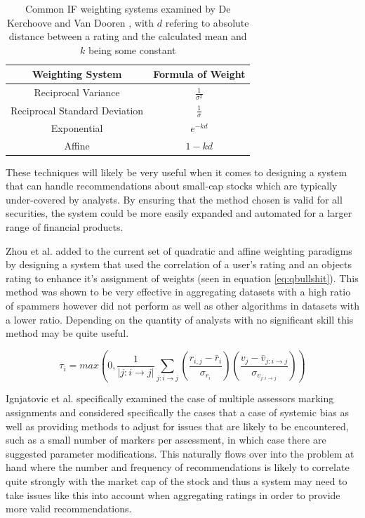 \begin{table}[H]
    \centering
    \begin{tabular}{c c}
    \toprule\toprule
    Weighting System & Formula of Weight \\ \midrule
    Reciprocal Variance & $\frac{1}{\sigma^2}$ \\
    \addlinespace
    Reciprocal Standard Deviation & $\frac{1}{\sigma}$\\
    \addlinespace
    Exponential & $e^{-kd}$ \\
    \addlinespace
    Affine & $1-kd$ \\ \bottomrule
    \end{tabular}
    \caption[Common IF weighting systems]{Common IF weighting systems examined by De Kerchoove and Van Dooren \cite{de2010iterative}, with $d$ refering to absolute distance between a rating and the calculated mean and $k$ being some constant}
    \label{tab:deKerchWeight}
\end{table}

These techniques will likely be very useful when it comes to designing a system that can handle recommendations about small-cap stocks which are typically under-covered by analysts. By ensuring that the method chosen is valid for all securities, the system could be more easily expanded and automated for a larger range of financial products.

Zhou et al. \cite{zhou2011robust} added to the current set of quadratic and affine weighting paradigms by designing a system that used the correlation of a user's rating and an objects rating to enhance it's assignment of weights (seen in equation \ref{eq:qbullshit}). This method was shown to be very effective in aggregating datasets with a high ratio of spammers however did not perform as well as other algorithms in datasets with a lower ratio. Depending on the quantity of analysts with no significant skill this method may be quite useful.


\begin{equation}
    \tau_i = max\left(0, 
    \frac{1}{|j:i\rightarrow j|}
    \sum\limits_{j:i\rightarrow j}
    \left(\frac{r_{i,j} - \bar{r}_i}{\sigma_{r_i}}\right)
    \left(\frac{v_{j} - \bar{v}_{j:i\rightarrow j}}{\sigma_{v_{j:i\rightarrow j}}}\right)
    \right) \label{eq:qbullshit}
\end{equation}

Ignjatovic et al. \cite{ignjatovic2009computing} specifically examined the case of multiple assessors marking assignments and considered specifically the cases that a case of systemic bias as well as providing methods to adjust for issues that are likely to be encountered, such as a small number of markers per assessment, in which case there are suggested parameter modifications. This naturally flows over into the problem at hand where the number and frequency of recommendations is likely to correlate quite strongly with the market cap of the stock and thus a system may need to take issues like this into account when aggregating ratings in order to provide more valid recommendations.

